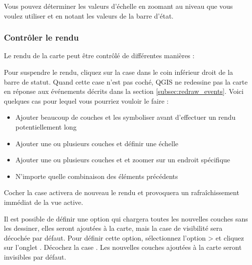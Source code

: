 Vous pouvez déterminer les valeurs d'échelle en zoomant au niveau que vous voulez utiliser et en notant les valeurs de la barre d'état.

\subsubsection{Contrôler le rendu}\label{label_controlmap}

Le rendu de la carte peut être contrôlé de différentes manières :

\label{label_suspendrender}

Pour suspendre le rendu, cliquez sur la case dans le coin inférieur droit de la barre de statut. Quand cette case n'est pas coché, QGIS ne redessine pas la carte en réponse aux événements décrits dans la section \ref{subsec:redraw_events}. Voici quelques cas pour lequel vous pourriez vouloir le faire :

\begin{itemize}
\item Ajouter beaucoup de couches et les symboliser avant d'effectuer un rendu potentiellement long
\item Ajouter une ou plusieurs couches et définir une échelle
\item Ajouter une ou plusieurs couches et et zoomer sur un endroit spécifique
\item N'importe quelle combinaison des éléments précédents
\end{itemize}

Cocher la case  activera de nouveau le rendu et provoquera un rafraîchissement immédiat de la vue active.

\label{label_settinglayer}

Il est possible de définir une option qui chargera toutes les nouvelles couches sans les dessiner, elles seront ajoutées à la carte, mais la case de visibilité sera décochée par défaut. Pour définir cette option, sélectionnez l'option  >  et cliquez sur l'onglet . Décochez la case . Les nouvelles couches ajoutées à la carte seront invisibles par défaut.

\label{label_stoprender}

